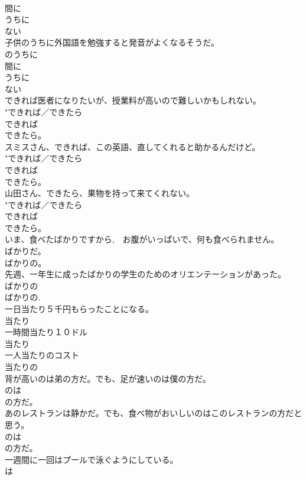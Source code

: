 \documentclass[8pt]{extreport}
\begin{document}
\begin{CJK}{UTF8}{min}
{\\	間に 
\\	うちに 
\\	ない 
\\	子供のうちに外国語を勉強すると発音がよくなるそうだ。	
\\	のうちに 
\\	間に 
\\	うちに 
\\	ない 
\\	できれば医者になりたいが、授業料が高いので難しいかもしれない。	
\\	"できれば／できたら 
\\	できれば 
\\	できたら。
\\	スミスさん、できれば、この英語、直してくれると助かるんだけど。	
\\	"できれば／できたら 
\\	できれば 
\\	できたら。
\\	山田さん、できたら、果物を持って来てくれない。	
\\	"できれば／できたら 
\\	できれば 
\\	できたら。
\\	いま、食べたばかりですから,　お腹がいっぱいで、何も食べられません。	
\\	ばかりだ。 
\\	ばかりの。
\\	先週、一年生に成ったばかりの学生のためのオリエンテーションがあった。	
\\	ばかりの 
\\	ばかりの.
\\	一日当たり５千円もらったことになる。	
\\	当たり
\\	一時間当たり１０ドル	
\\	当たり
\\	一人当たりのコスト	
\\	当たりの
\\	背が高いのは弟の方だ。でも、足が速いのは僕の方だ。	
\\	のは
\\	の方だ。 
\\	あのレストランは静かだ。でも、食べ物がおいしいのはこのレストランの方だと思う。	
\\	のは
\\	の方だ。 
\\	一週間に一回はプールで泳ぐようにしている。	
\\	は 
}
\end{CJK}
\end{document}
